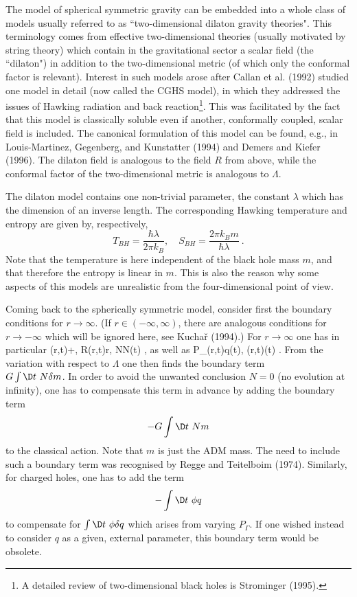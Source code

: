 The model of spherical symmetric gravity can be embedded into a
whole class of models usually referred to as ``two-dimensional
dilaton gravity theories". This terminology comes from effective
two-dimensional theories (usually motivated by string theory)
 which contain in the gravitational sector
 a scalar field (the ``dilaton") in addition to
the two-dimensional metric (of which only the conformal factor
is relevant). 
Interest in such models arose after Callan et al. (1992) studied
one model in detail (now called the CGHS model), in which they
addressed the issues of Hawking radiation
 and back reaction\footnote{A detailed review
 of two-dimensional black holes
is Strominger (1995).}.
This was facilitated by the fact that this model is classically
soluble even if another, conformally coupled, scalar field
is included. The canonical formulation of this model can be found,
e.g., in Louis-Martinez, Gegenberg, and Kunstatter (1994) and
Demers and Kiefer (1996). The dilaton field is analogous
to the field $R$ from above, while the conformal factor of the
two-dimensional metric is analogous to $\Lambda$.

\vskip 2mm
\small
The dilaton model contains one non-trivial parameter, the
constant $\lambda$ which has the dimension of an inverse length.
The corresponding Hawking temperature and entropy are given by,
respectively,
\[ T_{BH}=\frac{\hbar\lambda}{2\pi k_B},\quad
   S_{BH}=\frac{2\pi k_B m}{\hbar\lambda}\ . \]
Note that the temperature is here independent of the black hole
mass $m$, and that therefore the entropy is linear in $m$.
This is also the reason why some aspects of this models
are unrealistic from the four-dimensional point of view.

\vskip 2mm
\normalsize

Coming back to the spherically symmetric model, consider first
the boundary conditions for $r\to\infty$. (If $r\in(-\infty,\infty)$,
there are analogous conditions for $r\to-\infty$ which will be
ignored here, see Kucha\v{r} (1994).) For $r\to\infty$ one has
in particular
\be \Lambda(r,t)+,\; R(r,t)\to r,\;
    N\to N(t) \enspace, \ee
as well as
\be P_{\Gamma}(r,t)\to q(t), \quad \phi(r,t)\to \phi(t) \enspace .\ee
{}From the variation with respect to $\Lambda$ one then finds the
boundary term \\ $G\int \D t\ N\delta m$. In order to avoid the unwanted
conclusion $N=0$ (no evolution at infinity), one has to
compensate this term in advance by adding the boundary term
\[ -G\int\D t\ Nm \]
to the classical action. Note that $m$ is just the ADM mass.
The need to include such a boundary term was recognised by
Regge and Teitelboim (1974).
Similarly, for charged holes, one has to add the term
\[ -\int\D t\ \phi q \]
to compensate for $\int \D t\ \phi\delta q$ which arises from
varying $P_{\Gamma}$. If one wished instead to consider $q$ as a given,
external parameter, this boundary term would be obsolete.

